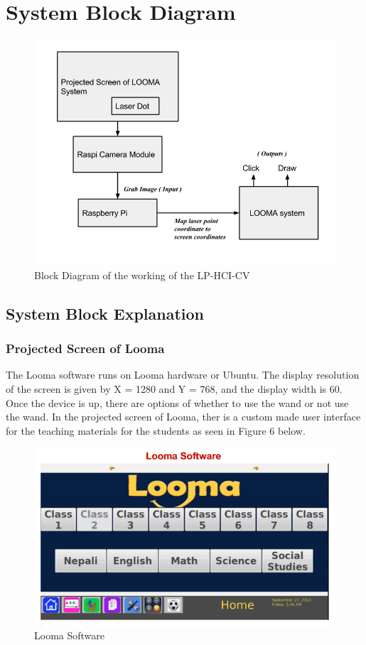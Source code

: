 \documentclass[12pt, a4paper]{article}
\begin{document}
\section{System Block Diagram}
\begin{figure}[htp]
\centering
\includegraphics[scale=0.45]{block_diagram.png}
\caption{Block Diagram of the working of the LP-HCI-CV}
\label{ }
\end{figure}
\subsection{System Block Explanation}
\subsubsection{Projected Screen of Looma}

The Looma software runs on Looma hardware or Ubuntu. The display resolution of the screen is given by X = 1280 and Y = 768, and the display width is 60. Once the device is up, there are options of whether to use the wand or not use the wand. In the projected screen of Looma, ther is a custom made user interface for the teaching materials for the students as seen in Figure 6 below.

\begin{figure}[htp]
	\centering
		\includegraphics[scale=0.19]{loomasoftware.png}
	\caption{Looma Software}
\label{}
\end{figure}
\end{document}
